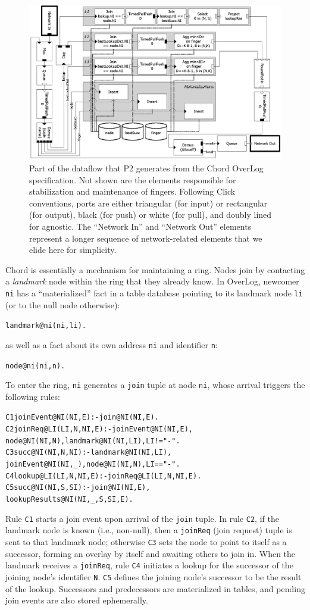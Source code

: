 \documentclass{sig-alt-full}
\def\Sys{P2\xspace}
\def\Lang{OverLog\xspace}
\newcommand{\ol}[1]{{\tt\footnotesize#1}}
\newenvironment{overlog}{\begin{alltt}\small}{\end{alltt}}
\begin{document}
\begin{figure}[th]
\centerline{\includegraphics{ChordLookup}}
\caption{Part of the dataflow that \Sys generates from the Chord \Lang
specification.  Not shown are the elements responsible for
stabilization and maintenance of fingers.  Following
Click conventions, ports are either triangular (for input) or
rectangular (for output), black (for push) or white (for pull), and
doubly lined for agnostic.  The ``Network In'' and
``Network Out'' elements represent a longer sequence of network-related
elements that we elide here for simplicity.}
\label{fig:ChordLookup}
\end{figure}

Chord is essentially a mechanism for maintaining a ring.  Nodes join 
by contacting a \emph{landmark} node within the
ring that they already know.  In \Lang, newcomer \ol{ni} has a
``materialized'' fact
in a table database pointing to its landmark node \ol{li} (or to the null
node otherwise): 
\begin{overlog}
landmark@ni(ni,li).
\end{overlog}
as well as a fact about its own address \ol{ni} and identifier \ol{n}:
\begin{overlog}
node@ni(ni,n).
\end{overlog}
To enter the ring, \ol{ni} generates a \ol{join}
tuple at node \ol{ni}, whose arrival triggers the
following rules:
\begin{overlog}
C1 joinEvent@NI(NI,E) :- join@NI(NI,E).
C2 joinReq@LI(LI,N,NI,E) :- joinEvent@NI(NI,E),
  node@NI(NI,N), landmark@NI(NI,LI), LI != "-".
C3 succ@NI(NI,N,NI) :- landmark@NI(NI,LI),
  joinEvent@NI(NI,_), node@NI(NI,N), LI == "-".
C4 lookup@LI(LI,N,NI,E) :- joinReq@LI(LI,N,NI,E).
C5 succ@NI(NI,S,SI) :- join@NI(NI,E),
  lookupResults@NI(NI,_,S,SI,E).
\end{overlog}
Rule \ol{C1} starts a join event upon arrival of
the \ol{join} tuple.  In rule \ol{C2}, if the
landmark node is known (i.e., non-null), then a
\ol{joinReq} (join request) tuple is sent to that landmark node;
otherwise \ol{C3} sets the node to point to itself
as a successor, forming an overlay by itself and
awaiting others to join in.  When the landmark
receives a \ol{joinReq}, rule \ol{C4} initiates a
lookup for the successor of the joining node's identifier
\ol{N}.  \ol{C5} defines the joining node's successor to be
the result of the lookup. Successors and
predecessors are materialized in tables, and
pending join events are also stored ephemerally.
\end{document}
